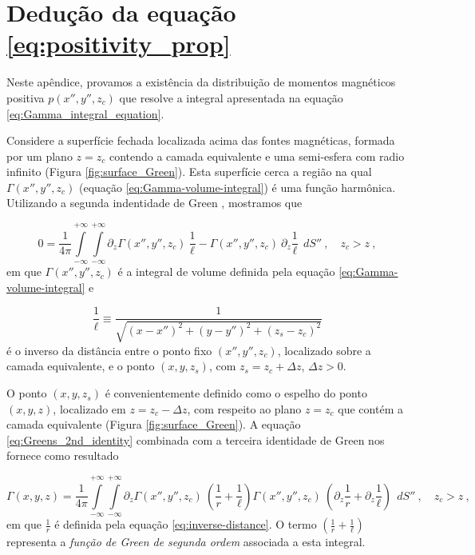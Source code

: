 \chapter{Dedução da equação \ref{eq:positivity_prop}}
\label{append:proof-positive-p}

Neste apêndice, provamos a existência da distribuição de momentos magnéticos positiva $p(x'', y'', z_{c})$ que resolve a integral apresentada na equação \ref{eq:Gamma_integral_equation}. 

Considere a superfície fechada localizada acima das fontes magnéticas, formada por um plano $z = z_{c}$ contendo a camada equivalente e uma semi-esfera com radio infinito (Figura \ref{fig:surface_Green}). Esta superfície cerca a região na qual  $\Gamma(x'', y'', z_{c})$ (equação \ref{eq:Gamma-volume-integral}) é uma função harmônica. Utilizando a segunda indentidade de Green \citep[][ p. 215]{kellogg1967}, mostramos que 

\begin{equation}
0 = \frac{1}{4\pi}
\int\limits_{-\infty}^{+\infty}\int\limits_{-\infty}^{+\infty}
\partial_{z} \Gamma(x'', y'', z_{c}) \: \frac{1}{\ell} - 
\Gamma(x'', y'', z_{c}) \: \partial_{z} \frac{1}{\ell}
\:\: dS'' \: , \quad z_{c} > z \: ,
\label{eq:Greens_2nd_identity}
\end{equation}
em que $\Gamma(x'', y'', z_{c})$ é a integral de volume definida pela equação \ref{eq:Gamma-volume-integral} e 

\begin{equation}
\frac{1}{\ell} \equiv \frac{1}{\sqrt{(x - x'')^{2} +
		(y - y'')^{2} +
		(z_{s} - z_{c})^{2}}}
\label{eq:inv-l}
\end{equation}
é o inverso da distância entre o ponto fixo $(x'', y'', z_{c})$, localizado sobre a camada equivalente, e o ponto $(x, y, z_{s})$, com $z_{s} = z_{c} + \Delta z$, $\Delta z > 0$. 

O ponto $(x, y, z_{s})$ é convenientemente definido como o espelho do ponto $(x, y, z)$, localizado em $z = z_{c} - \Delta z$, com respeito ao plano $z = z_{c}$ que contém a camada equivalente (Figura \ref{fig:surface_Green}). A equação \ref{eq:Greens_2nd_identity} combinada com a terceira identidade de Green \citep[][ p. 219]{kellogg1967} nos fornece como resultado 

\begin{equation}
\Gamma(x, y, z) = \frac{1}{4\pi}
\int\limits_{-\infty}^{+\infty}\int\limits_{-\infty}^{+\infty}
\partial_{z} \Gamma(x'', y'', z_{c}) \: 
\left( \frac{1}{r} + \frac{1}{\ell} \right)
\Gamma(x'', y'', z_{c}) \: 
\left( \partial_{z} \frac{1}{r} + \partial_{z} \frac{1}{\ell} \right)
\:\: dS'' \: , \quad z_{c} > z \: ,
\label{eq:Greens_3rd_identity}
\end{equation}
em que $\frac{1}{r}$ é definida pela equação \ref{eq:inverse-distance}. O termo $\left( \frac{1}{r} + \frac{1}{\ell} \right)$ representa a \textit{função de Green de segunda ordem} \citep[][ p. 246]{kellogg1967} associada a esta integral. 

